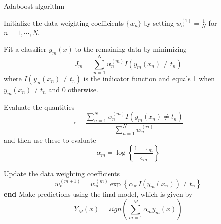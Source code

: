 \begin{algorithm}
    \caption{Adaboost algorithm}
    \begin{algorithmic}[1]
        \State Initialize the data weighting coefficients $\{w_n\}$ by setting
        $w_n^{(1)} = \frac{1}{N}$ for $n = 1, \cdots, N$.
        \State \parbox[t]{\dimexpr\linewidth-\algorithmicindent}
        {Fit a classifier $y_m(x)$ to the remaining data by minimizing
        \begin{equation*}
            J_m = \sum^{N}_{n=1}{w_n^{(m)} I(y_m(x_n) \ne t_n)}
        \end{equation*}
        where $I(y_m(x_n) \ne t_n)$ is the indicator function and equals 1
        when $y_m(x_n) \ne t_n$ and 0 otherwise.}

        \vspace{0.25cm}

        \State \parbox[t]{\dimexpr\linewidth-\algorithmicindent}
        {Evaluate the quantities
        \begin{equation*}
            \epsilon = \frac{\displaystyle\sum^{N}_{n=1}{w_n^{(m)}I(y_m(x_n) \ne
        t_n)}}{\displaystyle\sum^{N}_{n=1}{w_n^{(m)}}}
        \end{equation*}
        and then use these to evaluate
        \begin{equation*}
            \alpha_m = \log\left\{ \frac{1 - \epsilon_m}{\epsilon_m} \right\}
        \end{equation*}
        \strut }

        \State Update the data weighting coefficients
        \begin{equation*}
            w_n^{(m+1)} = w_n^{(m)} \exp\left\{ \alpha_mI(y_m(x_n)) \ne t_n \right\}
        \end{equation*}
        \EndFor
        \State \textbf{end}
        \State Make predictions using the final model, which is given by
        \begin{equation*}
            Y_M(x) = sign\left( \sum^{M}_{m=1}{\alpha_m y_m (x)} \right)
        \end{equation*}
    \end{algorithmic}
    \label{alg:Adaboost}
\end{algorithm}



